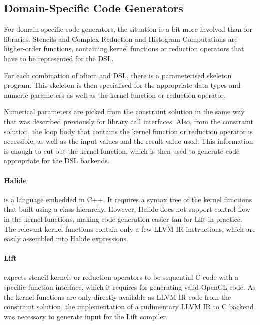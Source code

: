 \subsection{Domain-Specific Code Generators}

    For domain-specific code generators, the situation is a bit more involved
    than for libraries.
    Stencils and Complex Reduction and Histogram Computations are higher-order
    functions, containing kernel functions or reduction operators that have to
    be represented for the DSL.

    For each combination of idiom and DSL, there is a parameterised
    skeleton program.
    This skeleton is then specialised for the appropriate data types and numeric
    parameters as well as the kernel function or reduction operator.

    Numerical parameters are picked from the constraint solution in the same way
    that was described previously for library call interfaces.
    Also, from the constraint solution, the loop body that contains the kernel
    function or reduction operator is accessible, as well as the input values
    and the result value used.
    This information is enough to cut out the kernel function, which is then
    used to generate code appropriate for the DSL backends.

    \paragraph*{Halide}
    is a language embedded in C++.
    It requires a syntax tree of the kernel functions that built using a class
    hierarchy.
    However, Halide does not support control flow in the kernel functions,
    making code generation easier tan for Lift in practice.
    The relevant kernel functions contain only a few LLVM IR instructions, which
    are easily assembled into Halide expressions.

    \paragraph*{Lift}
    expects stencil kernels or reduction operators to be sequential C code with
    a specific function interface, which it requires for generating valid
    OpenCL code.
    As the kernel functions are only directly available as LLVM IR code from the
    constraint solution, the implementation of a rudimentary LLVM IR to C
    backend was necessary to generate input for the Lift compiler.

